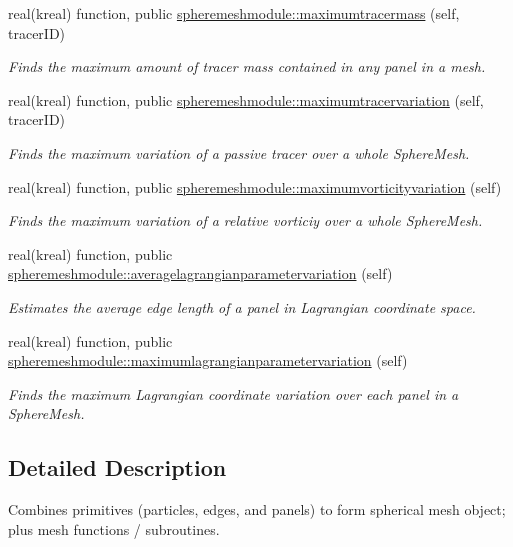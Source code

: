 \begin{DoxyCompactItemize}
real(kreal) function, public \hyperlink{group__SphereMesh_ga5e91a046c4930eb535d416ecd186d642}{spheremeshmodule\+::maximumtracermass} (self, tracer\+I\+D)
\begin{DoxyCompactList}\small\item\em Finds the maximum amount of tracer mass contained in any panel in a mesh. \end{DoxyCompactList}\item 
real(kreal) function, public \hyperlink{group__SphereMesh_ga6f36560d3412a7d7e4cfa5befdb7533a}{spheremeshmodule\+::maximumtracervariation} (self, tracer\+I\+D)
\begin{DoxyCompactList}\small\item\em Finds the maximum variation of a passive tracer over a whole Sphere\+Mesh. \end{DoxyCompactList}\item 
real(kreal) function, public \hyperlink{group__SphereMesh_gaae2d1cf4ffc3bae54040cbeea7b7d0be}{spheremeshmodule\+::maximumvorticityvariation} (self)
\begin{DoxyCompactList}\small\item\em Finds the maximum variation of a relative vorticiy over a whole Sphere\+Mesh. \end{DoxyCompactList}\item 
real(kreal) function, public \hyperlink{group__SphereMesh_gaa98d1a869045c29e59c388b3defd5267}{spheremeshmodule\+::averagelagrangianparametervariation} (self)
\begin{DoxyCompactList}\small\item\em Estimates the average edge length of a panel in Lagrangian coordinate space. \end{DoxyCompactList}\item 
real(kreal) function, public \hyperlink{group__SphereMesh_ga27be9c6a5c086d37db3dd65c2c8ec37b}{spheremeshmodule\+::maximumlagrangianparametervariation} (self)
\begin{DoxyCompactList}\small\item\em Finds the maximum Lagrangian coordinate variation over each panel in a Sphere\+Mesh. \end{DoxyCompactList}\end{DoxyCompactItemize}


\subsection{Detailed Description}
Combines primitives (particles, edges, and panels) to form spherical mesh object; plus mesh functions / subroutines. 

